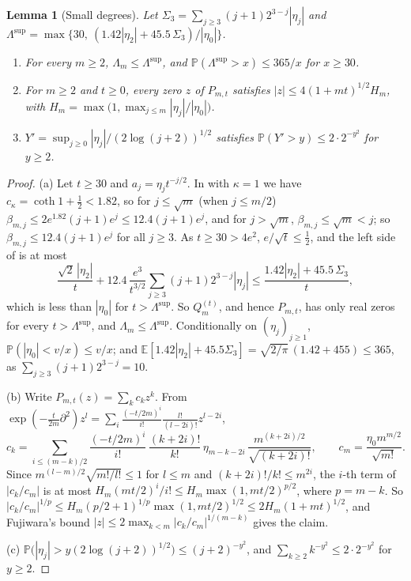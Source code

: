 \documentclass[11pt]{amsart}
\newtheorem{lemma}[theorem]{Lemma}
\theoremstyle{definition}
\theoremstyle{remark}
\numberwithin{equation}{section}
\newcommand{\E}{\mathbb{E}}
\newcommand{\PP}{\mathbb{P}}
\begin{document}
\begin{lemma}[Small degrees]\label{lem:smalldeg}
Let $\Sigma_3=\sum_{j\ge3}(j+1)2^{3-j}|\eta_j|$ and $\Lambda^{\sup}=\max\{30,\ (1.42|\eta_2|+45.5\,\Sigma_3)/|\eta_0|\}$.
\begin{enumerate}
\item[(a)] For every $m\ge2$, $\Lambda_m\le\Lambda^{\sup}$, and $\PP(\Lambda^{\sup}>x)\le365/x$ for $x\ge30$.
\item[(b)] For $m\ge2$ and $t\ge0$, every zero $z$ of $P_{m,t}$ satisfies $|z|\le4(1+mt)^{1/2}H_m$, with $H_m=\max\bigl(1,\max_{j\le m}|\eta_j|/|\eta_0|\bigr)$.
\item[(c)] $Y'=\sup_{j\ge0}|\eta_j|/(2\log(j+2))^{1/2}$ satisfies $\PP(Y'>y)\le2\cdot2^{-y^2}$ for $y\ge2$.
\end{enumerate}
\end{lemma}

\begin{proof}
(a) Let $t\ge30$ and $a_j=\eta_jt^{-j/2}$. In \cite[Lemma~\ref{M-lem:interlace}(c)]{Main} with $\kappa=1$ we have $c_\kappa=\coth1+\frac12<1.82$, so for $j\le\sqrt m$ (when $j\le m/2$) $\beta_{m,j}\le2e^{1.82}(j+1)e^j\le12.4(j+1)e^j$, and for $j>\sqrt m$, $\beta_{m,j}\le\sqrt m<j$; so $\beta_{m,j}\le12.4(j+1)e^j$ for all $j\ge3$. As $t\ge30>4e^2$, $e/\sqrt t\le\frac12$, and the left side of \cite[\eqref{M-eq:interlace-crit}]{Main} is at most
\[
\frac{\sqrt2\,|\eta_2|}t+12.4\,\frac{e^3}{t^{3/2}}\sum_{j\ge3}(j+1)2^{3-j}|\eta_j|\le\frac{1.42|\eta_2|+45.5\,\Sigma_3}t,
\]
which is less than $|\eta_0|$ for $t>\Lambda^{\sup}$. So $Q_m^{(t)}$, and hence $P_{m,t}$, has only real zeros for every $t>\Lambda^{\sup}$, and $\Lambda_m\le\Lambda^{\sup}$. Conditionally on $(\eta_j)_{j\ge1}$, $\PP(|\eta_0|<v/x)\le v/x$; and $\E[1.42|\eta_2|+45.5\Sigma_3]=\sqrt{2/\pi}\,(1.42+455)\le365$, as $\sum_{j\ge3}(j+1)2^{3-j}=10$.

(b) Write $P_{m,t}(z)=\sum_kc_kz^k$. From $\exp(-\frac t{2m}\partial^2)z^l=\sum_i\frac{(-t/2m)^i}{i!}\frac{l!}{(l-2i)!}z^{l-2i}$,
\[
c_k=\sum_{i\le(m-k)/2}\frac{(-t/2m)^i}{i!}\,\frac{(k+2i)!}{k!}\,\eta_{m-k-2i}\,\frac{m^{(k+2i)/2}}{\sqrt{(k+2i)!}},\qquad c_m=\frac{\eta_0m^{m/2}}{\sqrt{m!}}.
\]
Since $m^{(l-m)/2}\sqrt{m!/l!}\le1$ for $l\le m$ and $(k+2i)!/k!\le m^{2i}$, the $i$-th term of $|c_k/c_m|$ is at most $H_m(mt/2)^i/i!\le H_m\max(1,mt/2)^{p/2}$, where $p=m-k$. So $|c_k/c_m|^{1/p}\le H_m(p/2+1)^{1/p}\max(1,mt/2)^{1/2}\le2H_m(1+mt)^{1/2}$, and Fujiwara's bound $|z|\le2\max_{k<m}|c_k/c_m|^{1/(m-k)}$ \cite{Fuj} gives the claim.

(c) $\PP\bigl(|\eta_j|>y(2\log(j+2))^{1/2}\bigr)\le(j+2)^{-y^2}$, and $\sum_{k\ge2}k^{-y^2}\le2\cdot2^{-y^2}$ for $y\ge2$.
\end{proof}
\end{document}
